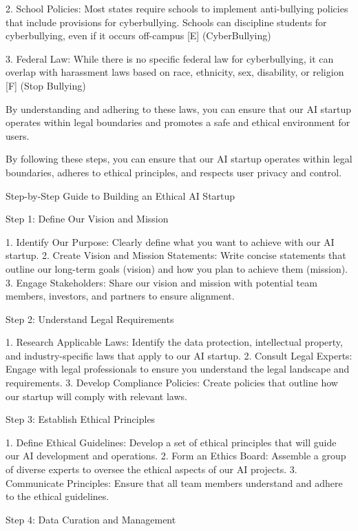 \documentclass[12pt,letterpaper]{article}
\begin{document}
2. School Policies: Most states require schools to implement anti-bullying policies that include provisions for cyberbullying. Schools can discipline students for cyberbullying, even if it occurs off-campus [E] (CyberBullying)

3. Federal Law: While there is no specific federal law for cyberbullying, it can overlap with harassment laws based on race, ethnicity, sex, disability, or religion [F] (Stop Bullying)

By understanding and adhering to these laws, you can ensure that our AI startup operates within legal boundaries and promotes a safe and ethical environment for users.


	
	
	
By following these steps, you can ensure that our AI startup operates within legal boundaries, adheres to ethical principles, and respects user privacy and control.

 


Step-by-Step Guide to Building an Ethical AI Startup

 Step 1: Define Our Vision and Mission

1. Identify Our Purpose: Clearly define what you want to achieve with our AI startup.
2. Create Vision and Mission Statements: Write concise statements that outline our long-term goals (vision) and how you plan to achieve them (mission).
3. Engage Stakeholders: Share our vision and mission with potential team members, investors, and partners to ensure alignment.

 Step 2: Understand Legal Requirements

1. Research Applicable Laws: Identify the data protection, intellectual property, and industry-specific laws that apply to our AI startup.
2. Consult Legal Experts: Engage with legal professionals to ensure you understand the legal landscape and requirements.
3. Develop Compliance Policies: Create policies that outline how our startup will comply with relevant laws.

 Step 3: Establish Ethical Principles

1. Define Ethical Guidelines: Develop a set of ethical principles that will guide our AI development and operations.
2. Form an Ethics Board: Assemble a group of diverse experts to oversee the ethical aspects of our AI projects.
3. Communicate Principles: Ensure that all team members understand and adhere to the ethical guidelines.

 Step 4: Data Curation and Management
\end{document}
